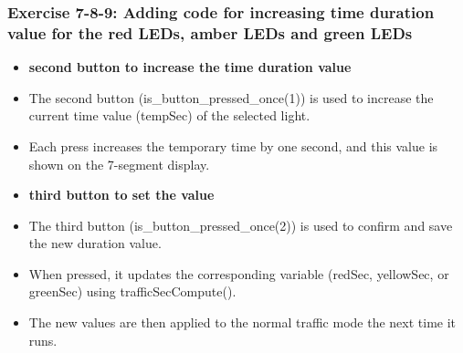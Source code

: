 \documentclass[a4paper,12pt]{article}
\begin{document}
\subsubsection{Exercise 7-8-9: Adding code for increasing time duration value for the
	red LEDs, amber LEDs and green LEDs}
\begin{itemize}
	\item[] \textbf{second button to increase the time duration value}
	\item[] The second button (is\_button\_pressed\_once(1)) is used to increase the current time value (tempSec) of the selected light.
	\item[] Each press increases the temporary time by one second, and this value is shown on the 7-segment display.
	\item[] \textbf{third button to set the value}
	\item[] The third button (is\_button\_pressed\_once(2)) is used to confirm and save the new duration value.
	\item[] When pressed, it updates the corresponding variable (redSec, yellowSec, or greenSec) using trafficSecCompute().
	\item[] The new values are then applied to the normal traffic mode the next time it runs.
\end{itemize}
\end{document}
